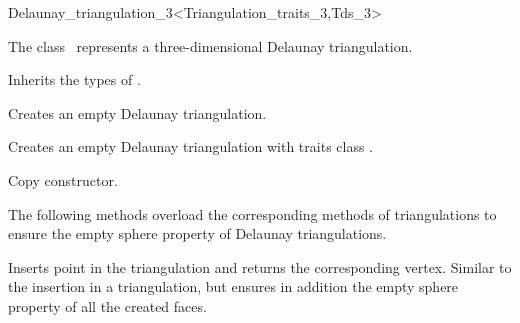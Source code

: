 

\begin{ccRefClass}{Delaunay_triangulation_3<Triangulation_traits_3,Tds_3>}  %


\ccDefinition
  
The class \ccRefName\ represents a three-dimensional Delaunay triangulation.



\ccTypes

Inherits the types of .

\ccCreation
{}  %



{Creates an empty Delaunay triangulation.}

{Creates an empty Delaunay triangulation with traits class
.}

{Copy constructor.}

\ccOperations


The following methods overload the corresponding methods of
triangulations to ensure the empty sphere property of Delaunay 
triangulations.

{Inserts point  in the triangulation and returns the corresponding
 vertex. Similar to the insertion in a triangulation, but ensures in
addition the empty sphere property of all the created faces.}


\end{ccRefClass}
